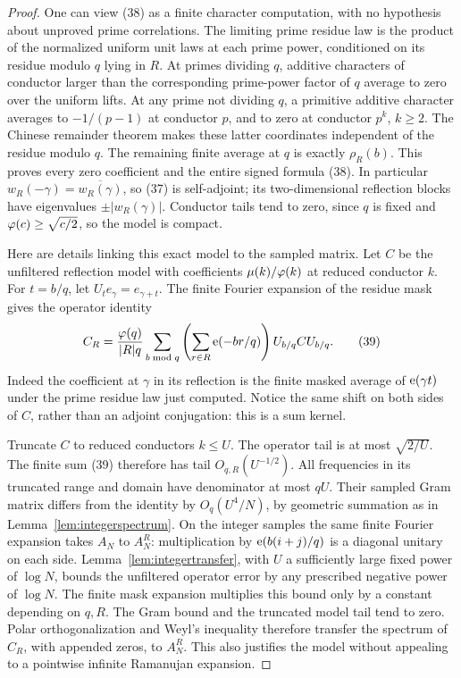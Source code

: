 \begin{proof}
One can view (38) as a finite character computation, with no
hypothesis about unproved prime correlations.
The limiting prime residue law is the product of the normalized
uniform unit laws at each prime power, conditioned on its residue
modulo \(q\) lying in \(R\).
At primes dividing \(q\), additive characters of conductor
larger than the corresponding prime-power factor of \(q\)
average to zero over the uniform lifts.
At any prime not dividing \(q\), a primitive additive character
averages to \(-1/(p-1)\) at conductor \(p\), and to zero at
conductor \(p^k\), \(k\geq2\).
The Chinese remainder theorem makes these latter coordinates
independent of the residue modulo \(q\).
The remaining finite average at \(q\) is exactly \(\rho_R(b)\).
This proves every zero coefficient and the entire signed formula
(38). In particular
\(w_R(-\gamma)=\overline{w_R(\gamma)}\), so (37) is self-adjoint;
its two-dimensional reflection blocks have eigenvalues
\(\pm|w_R(\gamma)|\).
Conductor tails tend to zero, since \(q\) is fixed and
\(\varphi(c)\geq\sqrt{c/2}\), so the model is compact.

Here are details linking this exact model to the sampled matrix.
Let \(C\) be the unfiltered reflection model with coefficients
\(\mu(k)/\varphi(k)\) at reduced conductor \(k\).
For \(t=b/q\), let \(U_t e_\gamma=e_{\gamma+t}\).
The finite Fourier expansion of the residue mask gives the
operator identity
\[
 C_R=\frac{\varphi(q)}{|R|q}
       \sum_{b\bmod q}
       \left(\sum_{r\in R}\mathrm e(-br/q)\right)U_{b/q}CU_{b/q}.
 \tag{39}
\]
Indeed the coefficient at \(\gamma\) in its reflection is the
finite masked average of \(\mathrm e(\gamma t)\) under the prime
residue law just computed.
Notice the same shift on both sides of \(C\), rather than an
adjoint conjugation: this is a sum kernel.

Truncate \(C\) to reduced conductors \(k\leq U\).
The operator tail is at most \(\sqrt{2/U}\).
The finite sum (39) therefore has tail \(O_{q,R}(U^{-1/2})\).
All frequencies in its truncated range and domain have
denominator at most \(qU\).
Their sampled Gram matrix differs from the identity by
\(O_q(U^4/N)\), by geometric summation as in
Lemma~\ref{lem:integerspectrum}.
On the integer samples the same finite Fourier expansion
takes \(A_N\) to \(A_N^R\): multiplication by
\(\mathrm e(b(i+j)/q)\) is a diagonal unitary on each side.
Lemma~\ref{lem:integertransfer}, with \(U\) a sufficiently
large fixed power of \(\log N\), bounds the unfiltered
operator error by any prescribed negative power of \(\log N\).
The finite mask expansion multiplies this bound only by a
constant depending on \(q,R\).
The Gram bound and the truncated model tail tend to zero.
Polar orthogonalization and Weyl's inequality therefore
transfer the spectrum of \(C_R\), with appended zeros, to
\(A_N^R\). This also justifies the model without appealing to
a pointwise infinite Ramanujan expansion.


\end{proof}
